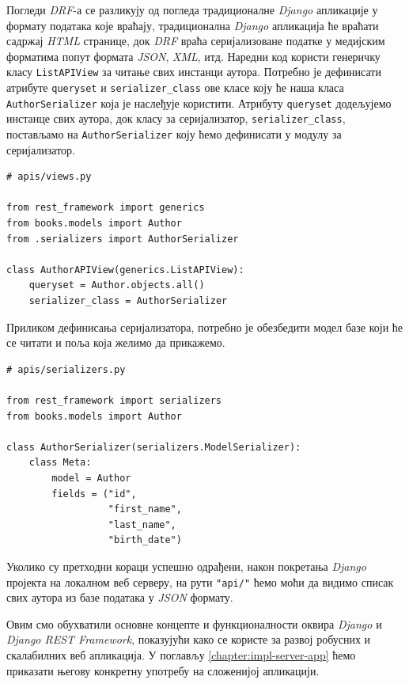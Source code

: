 \documentclass[12pt,oneside]{memoir}
\begin{document}
Погледи \textit{DRF}-а се разликују од погледа традиционалне \textit{Django} апликације у формату података које враћају, традиционална \textit{Django} апликација ће враћати садржај \textit{HTML} странице, док \textit{DRF} враћа серијализоване податке у медијским форматима попут формата \textit{JSON}, \textit{XML}, итд. Наредни код користи генеричку класу \texttt{ListAPIView} за читање свих инстанци аутора. Потребно је дефинисати атрибуте \texttt{queryset} и \texttt{serializer\_class} ове класе коју ће наша класа \texttt{AuthorSerializer} која је наслеђује користити. Атрибуту \texttt{queryset} додељујемо инстанце свих аутора, док класу за серијализатор, \texttt{serializer\_class}, постављамо на \texttt{AuthorSerializer} коју ћемо дефинисати у модулу за серијализатор.

\begin{lstlisting}
# apis/views.py

from rest_framework import generics
from books.models import Author
from .serializers import AuthorSerializer

class AuthorAPIView(generics.ListAPIView):
    queryset = Author.objects.all()
    serializer_class = AuthorSerializer
\end{lstlisting}

Приликом дефинисања серијализатора, потребно је обезбедити модел базе који ће се читати и поља која желимо да прикажемо.

\begin{lstlisting}
# apis/serializers.py

from rest_framework import serializers
from books.models import Author

class AuthorSerializer(serializers.ModelSerializer):
    class Meta:
        model = Author
        fields = ("id", 
                  "first_name", 
                  "last_name", 
                  "birth_date")
\end{lstlisting}

Уколико су претходни кораци успешно одрађени, након покретања \textit{Django} пројекта на локалном веб серверу, на рути \texttt{"api/"} ћемо моћи да видимо списак свих аутора из базе података у \textit{JSON} формату.
\vspace{0.7cm}

Овим смо обухватили основне концепте и функционалности оквира \textit{Django} и \textit{Django REST Framework}, показујући како се користе за развој робусних и скалабилних веб апликација. У поглављу \ref{chapter:impl-server-app} ћемо приказати његову конкретну употребу на сложенијој апликацији.
\end{document}
